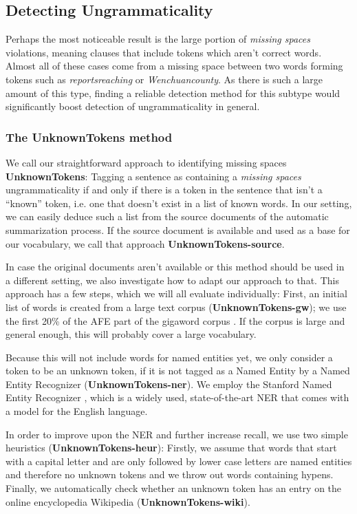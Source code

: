 \documentclass[a4paper,10pt]{scrartcl}
\theoremstyle{style}
\begin{document}
\subsection{Detecting Ungrammaticality}
\label{sec_unknowntokens}
Perhaps the most noticeable result is the large portion of \textit{missing spaces} violations, meaning clauses that include tokens which aren't correct words. Almost all of these cases come from a missing space between two words forming tokens such as \textit{reportsreaching} or \textit{Wenchuancounty}. As there is such a large amount of this type, finding a reliable detection method for this subtype would significantly boost detection of ungrammaticality in general.

\subsubsection{The UnknownTokens method}
We call our straightforward approach to identifying missing spaces \textbf{UnknownTokens}: Tagging a sentence as containing a \textit{missing spaces} ungrammaticality if and only if there is a token in the sentence that isn't a ``known'' token, i.e. one that doesn't exist in a list of known words. In our setting, we can easily deduce such a list from the source documents of the automatic summarization process. If the source document is available and used as a base for our vocabulary, we call that approach \textbf{UnknownTokens-source}.

In case the original documents aren't available or this method should be used in a different setting, we also investigate how to adapt our approach to that. This approach has a few steps, which we will all evaluate individually:
First, an initial list of words is created from a large text corpus (\textbf{UnknownTokens-gw}); we use the first 20\% of the AFE part of the gigaword corpus \citep{gigaword}. If the corpus is large and general enough, this will probably cover a large vocabulary.

Because this will not include words for named entities yet, we only consider a token to be an unknown token, if it is not tagged as a Named Entity by a Named Entity Recognizer (\textbf{UnknownTokens-ner}). We employ the Stanford Named Entity Recognizer \citep{stanfordNER}, which is a widely used, state-of-the-art NER that comes with a model for the English language.

In order to improve upon the NER and further increase recall, we use two simple heuristics (\textbf{UnknownTokens-heur}): Firstly, we assume that words that start with a capital letter and are only followed by lower case letters are named entities and therefore no unknown tokens and we throw out words containing hypens. Finally, we automatically check whether an unknown token has an entry on the online encyclopedia Wikipedia (\textbf{UnknownTokens-wiki}).
\end{document}
